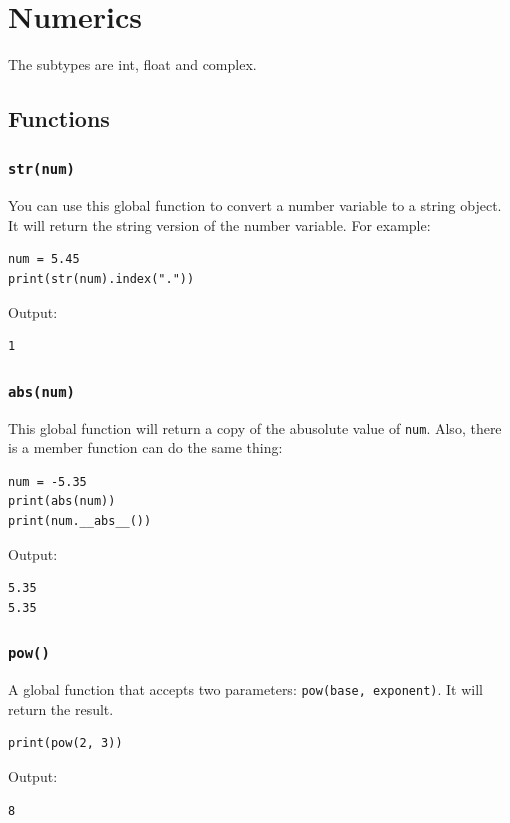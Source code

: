 \documentclass[12pt]{book}
\begin{document}
\section{Numerics}
\label{sec:org66a24f4}
The subtypes are int, float and complex.
\subsection{Functions}
\label{sec:org7490356}
\subsubsection{\texttt{str(num)}}
\label{sec:orgd663573}
You can use this global function to convert a number variable to a string object. It will return the string version of the number variable. For example:
\begin{verbatim}
num = 5.45
print(str(num).index("."))
\end{verbatim}

Output:
\begin{verbatim}
1
\end{verbatim}
\subsubsection{\texttt{abs(num)}}
\label{sec:orgb5cac7f}
This global function will return a copy of the abusolute value of \texttt{num}. Also, there is a member function can do the same thing:
\begin{verbatim}
num = -5.35
print(abs(num))
print(num.__abs__())
\end{verbatim}
Output:
\begin{verbatim}
5.35
5.35
\end{verbatim}

\subsubsection{\texttt{pow()}}
\label{sec:org7c9f371}
A global function that accepts two parameters: \texttt{pow(base, exponent)}. It will return the result.
\begin{verbatim}
print(pow(2, 3))
\end{verbatim}
Output:
\begin{verbatim}
8
\end{verbatim}
\end{document}
